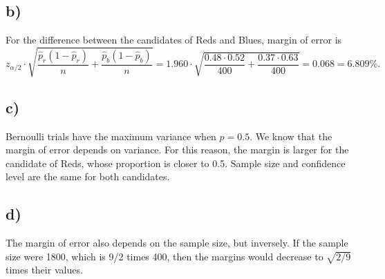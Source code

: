 \documentclass[12pt]{article}
\begin{document}
\subsection*{b)}
\noindent For the difference between the candidates of Reds and Blues, margin of error is
\[ z_{\alpha / 2} \cdot \sqrt{\frac{\hat{p}_{r} (1 - \hat{p}_{r})}{n} + \frac{\hat{p}_{b} (1 - \hat{p}_{b})}{n}} = 1.960 \cdot \sqrt{\frac{0.48 \cdot 0.52}{400} + \frac{0.37 \cdot 0.63}{400}} = 0.068 = 6.809\%. \]

\subsection*{c)}
\noindent Bernoulli trials have the maximum variance when $p = 0.5$. We know that the margin of error depends on variance. For this reason, the margin is larger for the candidate of Reds, whose proportion is closer to 0.5. Sample size and confidence level are the same for both candidates.

\subsection*{d)}
\noindent The margin of error also depends on the sample size, but inversely. If the sample size were 1800, which is 9/2 times 400, then the margins would decrease to $\sqrt{2/9}$ times their values.
\end{document}
